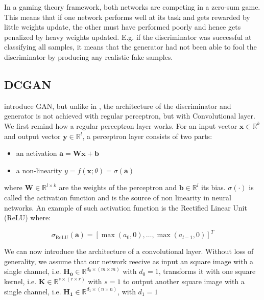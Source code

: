 \documentclass{article}
\begin{document}
In a gaming theory framework, both networks are competing in a zero-sum game. This means that if one network performs well at its task and gets rewarded by little weights update, the other must have performed poorly and hence gets penalized by heavy weights updated. E.g. if the discriminator was successful at classifying all samples, it means that the generator had not been able to fool the discriminator by producing any realistic fake samples.  



\subsection{DCGAN}

\cite{radford2015unsupervised} introduce GAN, but unlike in \cite{goodfellow2020generative}, the architecture of the discriminator and generator is not achieved with regular perceptron, but with Convolutional layer. We first remind how a regular perceptron layer works. For an input vector $\mathbf{x} \in \mathbb{R}^k$ and output vector $\mathbf{y} \in \mathbb{R}^l$, a perceptron layer consists of two parts:

\begin{itemize}
    \item an activation $\mathbf{a} = \mathbf{W} \mathbf{x} + \mathbf{b}$
    \item a non-linearity $y = f(\mathbf{x};\theta) = \sigma(\mathbf{a})$
\end{itemize}

where $\mathbf{W} \in \mathbb{R}^{l \times k}$ are the weights of the perceptron and $\mathbf{b} \in \mathbb{R}^l$ its bias. $\sigma(\cdot)$ is called the activation function and is the source of non linearity in neural networks. An example of such activation function is the Rectified Linear Unit (ReLU) where:

\begin{equation}
    \sigma_{\text{ReLU}}(\mathbf{a}) = [\max(a_0, 0), \dots, \max(a_{l-1}, 0)]^T
\end{equation}

We can now introduce the architecture of a convolutional layer. Without loss of generality, we assume that our network reecive as input an square image with a single channel, i.e. $\mathbf{H_0} \in \mathbb{R}^{d_0 \times (m \times m)}$ with $d_0 = 1$, transforms it with one square kernel, i.e. $\mathbf{K} \in \mathbb{R}^{s \times (r \times r)}$ with $s = 1$ to output another square image with a single channel, i.e. $\mathbf{H_1} \in \mathbb{R}^{d_1 \times (n \times n)}$, with $d_1 = 1$
\end{document}
